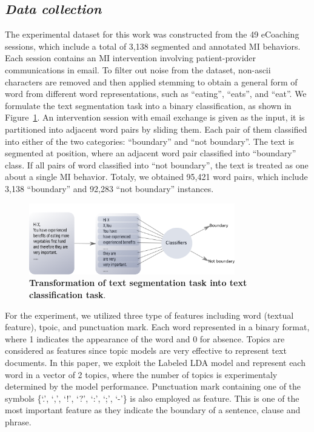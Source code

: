 \documentclass{amia}
\begin{document}
\subsection*{\textit{Data collection}}
The experimental dataset for this work was constructed from the 49 eCoaching sessions, which include a total of 3,138 segmented and annotated MI behaviors. Each session contains an MI intervention involving patient-provider communications in email. To filter out noise from the dataset, non-ascii characters are removed and then applied stemming to obtain a general form of word from different word representations, such as ``eating'', ``eats'', and ``eat''. We formulate the text segmentation task into a binary classification, as shown in Figure~\ref{fig:classifier}. An intervention session with email exchange is given as the input, it is partitioned into adjacent word pairs by sliding them. Each pair of them classified into either of the two categories: ``boundary'' and ``not boundary''. The text is segmented at position, where an adjacent word pair classified into ``boundary'' class. If all pairs of word classified into ``not boundary'', the text is treated as one about a single MI behavior. Totaly, we obtained 95,421 word pairs, which include 3,138 ``boundary'' and 92,283 ``not boundary'' instances.    

\begin{figure}[!htb]
    \centering
    \includegraphics[width=0.80\textwidth]{figures/classifier.png}
    \caption{\textbf{Transformation of text segmentation task into text classification task}.}
    \label{fig:classifier}
\end{figure}


For the experiment, we utilized three type of features including word (textual feature), tpoic, and punctuation mark. Each word represented in a binary format, where 1 indicates the appearance of the word and 0 for absence. Topics are considered as features since topic models are very effective\cite{kotov2015interpretable,hashimoto2016topic,lu2016modeling} to represent text documents. In this paper, we exploit the Labeled LDA model\cite{kotov2015interpretable} and represent each word in a vector of 2 topics, where the number of topics is experimentaly determined by the model performance. Punctuation mark containing one of the symbols \{`.', `,', `!', `?', `:', `;', `-'\} is also employed as feature. This is one of the most important feature as they indicate the boundary of a sentence, clause and phrase.   
\end{document}
